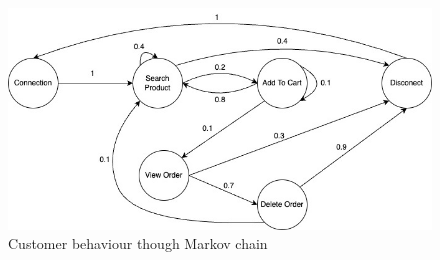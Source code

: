 \begin{figure}[H]
    \centering
    \includegraphics[width=\textwidth]{images/markovchain.jpg}
    \caption{Customer behaviour though Markov chain}
    \label{fig:markovchain}
\end{figure}


